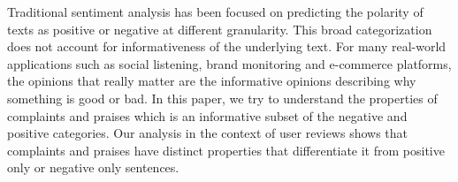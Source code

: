 Traditional sentiment analysis has been focused on predicting the polarity of texts as positive or negative at different granularity. This broad categorization does not account for informativeness of the underlying text. For many real-world applications such as social listening, brand monitoring and e-commerce platforms, the opinions that really matter are the informative opinions describing why something is good or bad. In this paper, we try to understand the properties of complaints and praises which is an informative subset of the negative and positive categories. Our analysis in the context of user reviews shows that complaints and praises have distinct properties that differentiate it from positive only or negative only sentences.
